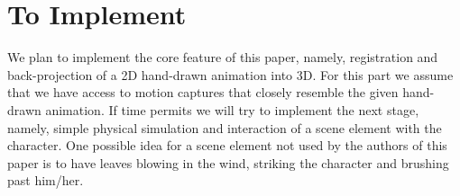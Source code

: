 \documentclass[a4paper,9pt]{article}
\begin{document}
\section{To Implement}

We plan to implement the core feature of this paper, namely, registration and back-projection of a 2D hand-drawn animation into 3D. For this part we assume that we have access to motion captures that closely resemble the given hand-drawn animation. If time permits we will try to implement the next stage, namely, simple physical simulation and interaction of a scene element with the character. One possible idea for a scene element not used by the authors of this paper is to have leaves blowing in the wind, striking the character and brushing past him/her.

{}

\end{document}
